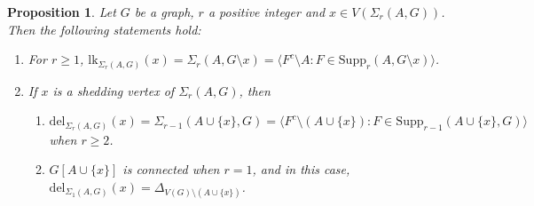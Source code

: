 \documentclass[12pt,reqno]{amsart}
\newtheorem{proposition}{Proposition}[section]
\theoremstyle{definition}
\newcommand{\lk}{{\mathrm{lk}}}
\newcommand{\del}{{\mathrm{del}}}
\def\del{\mathrm{del}}
\begin{document}
	\begin{proposition}\label{Eq. conditions for lk and del}
		Let $G$ be a graph, $r$ a positive integer and $x \in V(\Sigma_r(A,G))$. Then the following statements hold:
		\begin{enumerate}
			\item For $r \geq 1$, $\lk_{\Sigma_r(A,G)}(x) = \Sigma_r(A,G \setminus x) =  \langle F^{c} \setminus A : F \in \mathrm{Supp}_{r}(A,G\setminus x) \rangle$.
			\item  If $x$ is a shedding vertex of $\Sigma_r(A,G)$, then
			\begin{enumerate}
				\item $\del_{\Sigma_r(A,G)}(x) = \Sigma_{r-1}(A \cup \{x\},G) =  \langle F^{c} \setminus (A\cup \{x\}) : F \in \mathrm{Supp}_{r-1}(A\cup \{x\},G) \rangle$ when $r\ge 2$.
				
				\item $G[A\cup\{x\}]$ is connected when $r=1$, and in this case, $\del_{\Sigma_1(A,G)}(x) =\Delta_{V(G)\setminus (A\cup\{x\})}$.
			\end{enumerate}
		\end{enumerate}
	\end{proposition}
\end{document}
